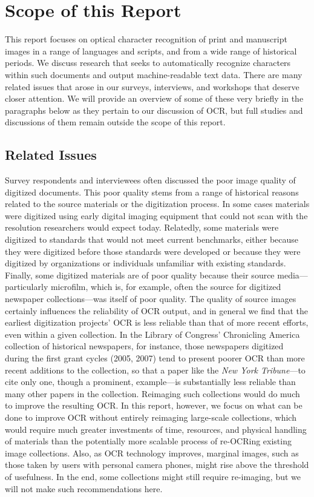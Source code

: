 \documentclass[twoside,11pt]{report}
\begin{document}
\section{Scope of this Report}

This report focuses on optical character recognition of print and manuscript images in a range of languages and scripts, and from a wide range of historical periods. We discuss research that seeks to automatically recognize characters within such documents and output machine-readable text data. There are many related issues that arose in our surveys, interviews, and workshops that deserve closer attention. We will provide an overview of some of these very briefly in the paragraphs below as they pertain to our discussion of OCR, but full studies and discussions of them remain outside the scope of this report.

\subsection{Related Issues}

Survey respondents and interviewees often discussed the poor image quality of digitized documents. This poor quality stems from a range of historical reasons related to the source materials or the digitization process. In some cases materials were digitized using early digital imaging equipment that could not scan with the resolution researchers would expect today. Relatedly, some materials were digitized to standards that would not meet current benchmarks, either because they were digitized before those standards were developed or because they were digitized by organizations or individuals unfamiliar with existing standards. Finally, some digitized materials are of poor quality because their source media---particularly microfilm, which is, for example, often the source for digitized newspaper collections---was itself of poor quality. The quality of source images certainly influences the reliability of OCR output, and in general we find that the earliest digitization projects' OCR is less reliable than that of more recent efforts, even within a given collection. In the Library of Congress' Chronicling America collection of historical newspapers, for instance, those newspapers digitized during the first grant cycles (2005, 2007) tend to present poorer OCR than more recent additions to the collection, so that a paper like the \emph{New York Tribune}---to cite only one, though a prominent, example---is substantially less reliable than many other papers in the collection. Reimaging such collections would do much to improve the resulting OCR. In this report, however, we focus on what can be done to improve OCR without entirely reimaging large-scale collections, which would require much greater investments of time, resources, and physical handling of materials than the potentially more scalable process of re-OCRing existing image collections. Also, as OCR technology improves, marginal images, such as those taken by users with personal camera phones, might rise above the threshold of usefulness. In the end, some collections might still require re-imaging, but we will not make such recommendations here.
\end{document}
